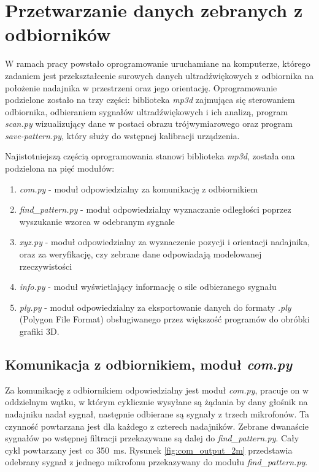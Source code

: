 \chapter{Przetwarzanie danych zebranych z odbiorników}

W ramach pracy powstało oprogramowanie uruchamiane na komputerze, którego zadaniem jest
przekształcenie surowych danych ultradźwiękowych 
z odbiornika na położenie nadajnika w przestrzeni oraz jego orientację.
Oprogramowanie podzielone zostało na trzy części: biblioteka \textit{mp3d} zajmująca się
sterowaniem odbiornika, odbieraniem sygnałów ultradźwiękowych i ich analizą, program \textit{scan.py}
wizualizujący dane w postaci obrazu trójwymiarowego oraz program \textit{save-pattern.py},
który służy do wstępnej kalibracji urządzenia.


Najistotniejszą częścią oprogramowania stanowi biblioteka \textit{mp3d}, została ona podzielona na pięć modułów:
\begin{enumerate}
 \item \textit{com.py} - moduł odpowiedzialny za komunikację z odbiornikiem
 \item \textit{find\_pattern.py} - moduł odpowiedzialny wyznaczanie odległości poprzez wyszukanie wzorca w odebranym sygnale
 \item \textit{xyz.py} - moduł odpowiedzialny za wyznaczenie pozycji i orientacji nadajnika, oraz za 
 weryfikację, czy zebrane dane odpowiadają modelowanej rzeczywistości
 \item \textit{info.py} - moduł wyświetlający informację o sile odbieranego sygnału
 \item \textit{ply.py} - moduł odpowiedzialny za eksportowanie danych do formaty \textit{.ply} 
    (Polygon File Format) obsługiwanego przez większość programów do obróbki grafiki 3D.
\end{enumerate}


\section{Komunikacja z odbiornikiem, moduł \textit{com.py}}

Za komunikację z odbiornikiem odpowiedzialny jest moduł \textit{com.py},
pracuje on w oddzielnym wątku, w którym cyklicznie wysyłane są żądania by dany głośnik na nadajniku nadał sygnał,
następnie odbierane są sygnały z trzech mikrofonów.
Ta czynność powtarzana jest dla każdego z czterech nadajników.
Zebrane dwanaście sygnałów po wstępnej filtracji przekazywane są dalej do \textit{find\_pattern.py}. Cały cykl powtarzany jest
co \SI{350}{ms}. Rysunek \ref{fig:com_output_2m} przedstawia odebrany sygnał z jednego mikrofonu przekazywany do modułu \textit{find\_pattern.py}.


